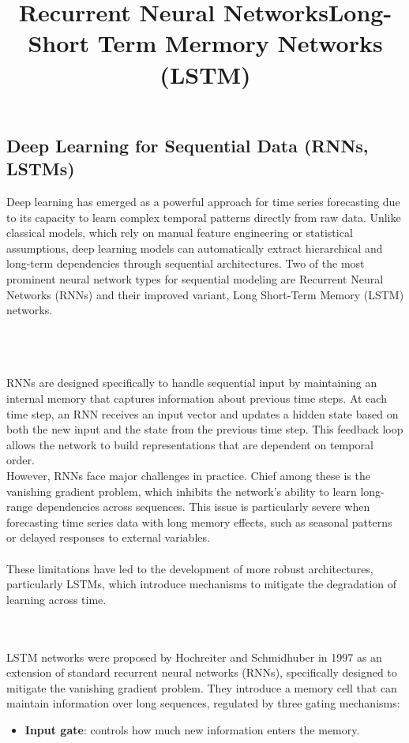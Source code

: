 \documentclass{article}
\begin{document}
\subsection{Deep Learning for Sequential Data (RNNs, LSTMs)}
Deep learning has emerged as a powerful approach for time series forecasting due to its capacity to learn complex temporal patterns directly from raw data. Unlike classical models, which rely on manual feature engineering or statistical assumptions, deep learning models can automatically extract hierarchical and long-term dependencies through sequential architectures. Two of the most prominent neural network types for sequential modeling are Recurrent Neural Networks (RNNs) and their improved variant, Long Short-Term Memory (LSTM) networks.\\
\\
\title{\textbf{Recurrent Neural Networks}}\\
\\
RNNs are designed specifically to handle sequential input by maintaining an internal memory that captures information about previous time steps. At each time step, an RNN receives an input vector and updates a hidden state based on both the new input and the state from the previous time step. This feedback loop allows the network to build representations that are dependent on temporal order.
\\
However, RNNs face major challenges in practice. Chief among these is the vanishing gradient problem, which inhibits the network's ability to learn long-range dependencies across sequences. This issue is particularly severe when forecasting time series data with long memory effects, such as seasonal patterns or delayed responses to external variables.\\
\\
These limitations have led to the development of more robust architectures, particularly LSTMs, which introduce mechanisms to mitigate the degradation of learning across time.\\
\\
\title{\textbf{Long-Short Term Mermory Networks (LSTM)}}\\
LSTM networks were proposed by Hochreiter and Schmidhuber in 1997 as an extension of standard recurrent neural networks (RNNs), specifically designed to mitigate the vanishing gradient problem. They introduce a memory cell that can maintain information over long sequences, regulated by three gating mechanisms:

\begin{itemize}
    \item \textbf{Input gate}: controls how much new information enters the memory.
\end{itemize}
\end{document}
